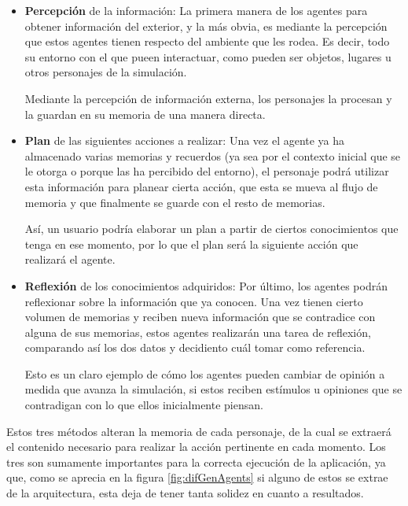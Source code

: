 \begin{itemize}
	\item\textbf{Percepción} de la información: La primera manera de los agentes para obtener información del exterior, y la más obvia, es mediante la percepción que estos agentes tienen respecto del ambiente que les rodea. Es decir, todo su entorno con el que pueen interactuar, como pueden ser objetos, lugares u otros personajes de la simulación.
	
	Mediante la percepción de información externa, los personajes la procesan y la guardan en su memoria de una manera directa.
	
	\item\textbf{Plan} de las siguientes acciones a realizar: Una vez el agente ya ha almacenado varias memorias y recuerdos (ya sea por el contexto inicial que se le otorga o porque las ha percibido del entorno), el personaje podrá utilizar esta información para planear cierta acción, que esta se mueva al flujo de memoria y que finalmente se guarde con el resto de memorias.
	
	Así, un usuario podría elaborar un plan a partir de ciertos conocimientos que tenga en ese momento, por lo que el plan será la siguiente acción que realizará el agente.
	
	\item\textbf{Reflexión} de los conocimientos adquiridos: Por último, los agentes podrán reflexionar sobre la información que ya conocen. Una vez tienen cierto volumen de memorias y reciben nueva información que se contradice con alguna de sus memorias, estos agentes realizarán una tarea de reflexión, comparando así los dos datos y decidiento cuál tomar como referencia.
	
	Esto es un claro ejemplo de cómo los agentes pueden cambiar de opinión a medida que avanza la simulación, si estos reciben estímulos u opiniones que se contradigan con lo que ellos inicialmente piensan.
\end{itemize}

Estos tres métodos alteran la memoria de cada personaje, de la cual se extraerá el contenido necesario para realizar la acción pertinente en cada momento. Los tres son sumamente importantes para la correcta ejecución de la aplicación, ya que, como se aprecia en la figura \ref{fig:difGenAgents} si alguno de estos se extrae de la arquitectura, esta deja de tener tanta solidez en cuanto a resultados.

